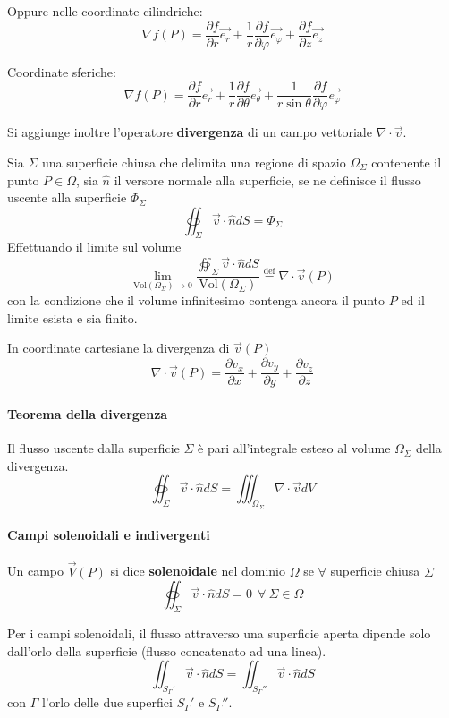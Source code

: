 Oppure nelle coordinate cilindriche:
$$
\nabla f(P) = \frac{\partial f}{\partial r}\vec{e_r} + \frac{1}{r}\frac{\partial f}{\partial \varphi}\vec{e_\varphi} + \frac{\partial f}{\partial z}\vec{e_z}
$$

Coordinate sferiche:
$$
\nabla f(P) = \frac{\partial f}{\partial r}\vec{e_r} + \frac{1}{r}\frac{\partial f}{\partial \theta}\vec{e_\theta} + \frac{1}{r\sin\theta} \frac{\partial f}{\partial \varphi}\vec{e_\varphi}
$$


Si aggiunge inoltre l'operatore \textbf{divergenza} di un campo vettoriale $\nabla\cdot\vec{v}$.

Sia $\Sigma$ una superficie chiusa che delimita una regione di spazio $\Omega_\Sigma$ contenente 
il punto $P\in\Omega$, sia $\hat{n}$ il versore normale alla
superficie, se ne definisce il flusso uscente alla superficie $\Phi_\Sigma$
$$
\oiint_\Sigma \vec{v}\cdot \hat{n}dS = \Phi_\Sigma
$$
Effettuando il limite sul volume 
$$
\lim_{\text{Vol}(\Omega_\Sigma)\to 0} \frac{\oiint_\Sigma \vec{v}\cdot \hat{n}dS}{\text{Vol}(\Omega_\Sigma)}
\stackrel{\text{def}}{=} \nabla\cdot \vec{v}(P)
$$
con la condizione che il volume infinitesimo contenga ancora il punto $P$ ed il limite esista e 
sia finito.

In coordinate cartesiane la divergenza di $\vec{v}(P)$
$$
\nabla\cdot\vec{v}(P) = \frac{\partial v_x}{\partial x} + \frac{\partial v_y}{\partial y} + \frac{\partial v_z}{\partial z}  
$$


\paragraph{Teorema della divergenza}
Il flusso uscente dalla superficie $\Sigma$ è pari all'integrale esteso al volume 
$\Omega_\Sigma$ della divergenza.
$$
\oiint_\Sigma \vec{v}\cdot \hat{n} dS = \iiint_{\Omega_\Sigma} \nabla\cdot \vec{v} d V
$$

\paragraph{Campi solenoidali e indivergenti}

Un campo $\vec{V}(P)$ si dice \textbf{solenoidale} nel dominio $\Omega$ se $\forall$ superficie chiusa $\Sigma$
$$
\oiint_\Sigma \vec{v}\cdot \hat{n} dS = 0\ \ \forall\ \Sigma \in \Omega
$$

Per i campi solenoidali, il flusso attraverso una superficie aperta dipende solo dall'orlo
della superficie (flusso concatenato ad una linea).
$$
\iint_{S_\Gamma'} \vec{v}\cdot\hat{n}dS = \iint_{S_\Gamma''} \vec{v}\cdot\hat{n}dS 
$$
con $\Gamma$ l'orlo delle due superfici $S_\Gamma'$ e $S_\Gamma''$.

